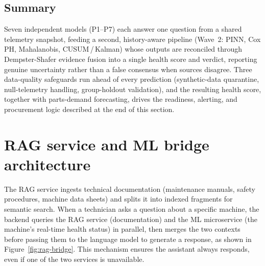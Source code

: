 \subsection{Summary}

Seven independent models (P1--P7) each answer one question from a shared telemetry snapshot, feeding a second, history-aware pipeline (Wave~2: PINN, Cox PH, Mahalanobis, CUSUM\,/\,Kalman) whose outputs are reconciled through Dempster-Shafer evidence fusion into a single health score and verdict, reporting genuine uncertainty rather than a false consensus when sources disagree. Three data-quality safeguards run ahead of every prediction (synthetic-data quarantine, null-telemetry handling, group-holdout validation), and the resulting health score, together with parts-demand forecasting, drives the readiness, alerting, and procurement logic described at the end of this section.

\section{RAG service and ML bridge architecture}

The RAG service ingests technical documentation (maintenance manuals, safety procedures, machine data sheets) and splits it into indexed fragments for semantic search. When a technician asks a question about a specific machine, the backend queries the RAG service (documentation) and the ML microservice (the machine's real-time health status) in parallel, then merges the two contexts before passing them to the language model to generate a response, as shown in Figure~\ref{fig:rag-bridge}. This mechanism ensures the assistant always responds, even if one of the two services is unavailable.

